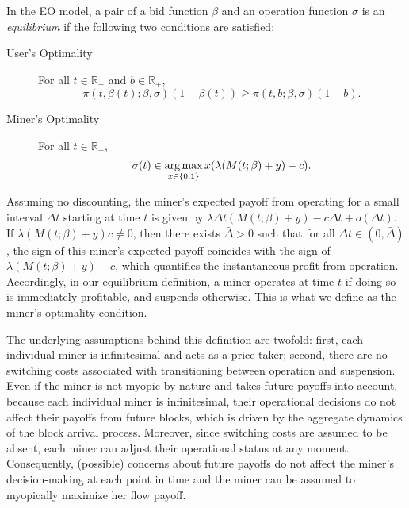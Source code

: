 \documentclass[12pt, letterpaper]{article}
\begin{document}
\begin{defn}\label{defn: model 2, equilibrium}
In the EO model, a pair of a bid function $\beta$ and an operation function $\sigma$ is an \emph{equilibrium} if the following two conditions are satisfied:
\begin{description}
    \item[User's Optimality] For all $t \in \mathbb{R}_+$ and $b \in \mathbb{R}_+$,
    \begin{equation}
        \pi(t, \beta(t); \beta, \sigma)(1 - \beta(t)) \ge \pi(t, b; \beta, \sigma)(1 - b).
    \end{equation}
    \item[Miner's Optimality] For all $t \in \mathbb{R}_+$,
    \begin{equation}
        \sigma(t) \in \operatorname*{arg\,max}_{x \in \{0, 1\}} x (\lambda (M(t; \beta) + y) - c).
    \end{equation}
\end{description}
\end{defn}

Assuming no discounting, the miner's expected payoff from operating for a small interval $\Delta t$ starting at time $t$ is given by $\lambda \Delta t (M(t; \beta) + y) - c \Delta t + o(\Delta t)$. 
If $\lambda (M(t; \beta) + y)  c \neq 0$, then there exists $\bar{\Delta} > 0$ such that for all $\Delta t \in (0, \bar{\Delta})$, the sign of this miner's expected payoff coincides with the sign of $\lambda (M(t; \beta) + y) - c$, which quantifies the instantaneous profit from operation. Accordingly, in our equilibrium definition, a miner operates at time $t$ if doing so is immediately profitable, and suspends otherwise. This is what we define as the miner's optimality condition.

The underlying assumptions behind this definition are twofold: first, each individual miner is infinitesimal and acts as a price taker; second, there are no switching costs associated with transitioning between operation and suspension. Even if the miner is not myopic by nature and takes future payoffs into account, because each individual miner is infinitesimal, their operational decisions do not affect their payoffs from future blocks, which is driven by the aggregate dynamics of the block arrival process. Moreover, since switching costs are assumed to be absent, each miner can adjust their operational status at any moment. Consequently, (possible) concerns about future payoffs do not affect the miner's decision-making at each point in time and the miner can be assumed to myopically maximize her flow payoff.
\end{document}
